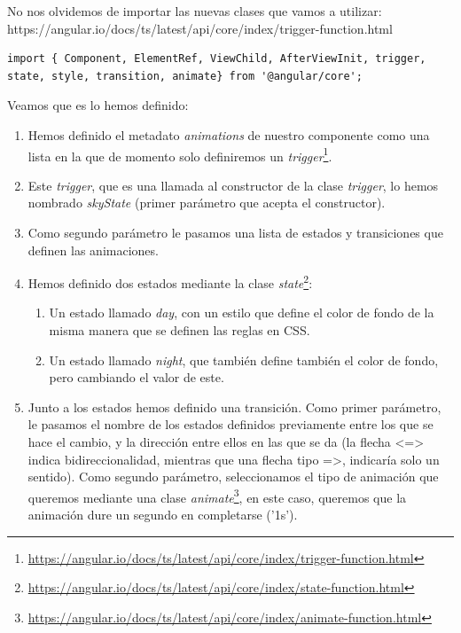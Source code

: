 No nos olvidemos de importar las nuevas clases que vamos a utilizar: https://angular.io/docs/ts/latest/api/core/index/trigger-function.html

{\begin{lstlisting}[style=htmlcssjs,frame=tlrb, xleftmargin={0.2cm}]
import { Component, ElementRef, ViewChild, AfterViewInit, trigger, state, style, transition, animate} from '@angular/core';
\end{lstlisting}}

Veamos que es lo hemos definido:

\begin{enumerate}
  \item Hemos definido el metadato \emph{animations} de nuestro componente como una lista en la que de momento solo definiremos un \emph{trigger}\footnote{\url{https://angular.io/docs/ts/latest/api/core/index/trigger-function.html}}.
  \item Este \emph{trigger}, que es una llamada al constructor de la clase \emph{trigger}, lo hemos nombrado \emph{skyState} (primer parámetro que acepta el constructor).
  \item Como segundo parámetro le pasamos una lista de estados y transiciones que definen las animaciones.
  \item Hemos definido dos estados mediante la clase \emph{state}\footnote{\url{https://angular.io/docs/ts/latest/api/core/index/state-function.html}}:
  \begin{enumerate}
    \item Un estado llamado \emph{day}, con un estilo que define el color de fondo de la misma manera que se definen las reglas en \gls{CSS}.
    \item Un estado llamado \emph{night}, que también define también el color de fondo, pero cambiando el valor de este.
  \end{enumerate}
  \item Junto a los estados hemos definido una transición. Como primer parámetro, le pasamos el nombre de los estados definidos previamente entre los que se hace el cambio, y la dirección entre ellos en las que se da (la flecha <=> indica bidireccionalidad, mientras que una flecha tipo =>, indicaría solo un sentido). Como segundo parámetro, seleccionamos el tipo de animación que queremos mediante una clase \emph{animate}\footnote{\url{https://angular.io/docs/ts/latest/api/core/index/animate-function.html}}, en este caso, queremos que la animación dure un segundo en completarse ('1s').
\end{enumerate}

